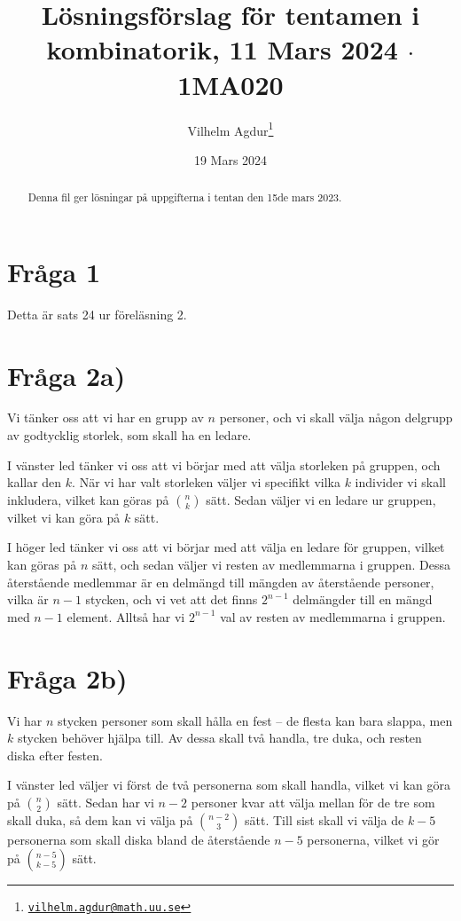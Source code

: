 \documentclass[nobib]{tufte-handout}
\title{Lösningsförslag för tentamen i kombinatorik, 11 Mars 2024 $\cdot$ 1MA020}
\author[Vilhelm Agdur]{Vilhelm Agdur\thanks{\href{mailto:vilhelm.agdur@math.uu.se}{\nolinkurl{vilhelm.agdur@math.uu.se}}}}
\date{19 Mars 2024}
\begin{document}

\maketitle%

\begin{abstract}
\noindent

Denna fil ger lösningar på uppgifterna i tentan den 15de mars 2023.

\end{abstract}

\section{Fråga 1}

Detta är sats 24 ur föreläsning 2.

\section{Fråga 2a)}

Vi tänker oss att vi har en grupp av $n$ personer, och vi skall välja någon delgrupp av godtycklig storlek, som skall ha en ledare.

I vänster led tänker vi oss att vi börjar med att välja storleken på gruppen, och kallar den $k$. När vi har valt storleken väljer vi specifikt vilka $k$ individer vi skall inkludera, vilket kan göras på ${n \choose k}$ sätt. Sedan väljer vi en ledare ur gruppen, vilket vi kan göra på $k$ sätt.

I höger led tänker vi oss att vi börjar med att välja en ledare för gruppen, vilket kan göras på $n$ sätt, och sedan väljer vi resten av medlemmarna i gruppen. Dessa återstående medlemmar är en delmängd till mängden av återstående personer, vilka är $n-1$ stycken, och vi vet att det finns $2^{n-1}$ delmängder till en mängd med $n-1$ element. Alltså har vi $2^{n-1}$ val av resten av medlemmarna i gruppen.

\section{Fråga 2b)}

Vi har $n$ stycken personer som skall hålla en fest -- de flesta kan bara slappa, men $k$ stycken behöver hjälpa till. Av dessa skall två handla, tre duka, och resten diska efter festen.

I vänster led väljer vi först de två personerna som skall handla, vilket vi kan göra på $n \choose 2$ sätt. Sedan har vi $n-2$ personer kvar att välja mellan för de tre som skall duka, så dem kan vi välja på $n - 2 \choose 3$ sätt. Till sist skall vi välja de $k-5$ personerna som skall diska bland de återstående $n-5$ personerna, vilket vi gör på $n - 5 \choose k - 5$ sätt.
\end{document}
